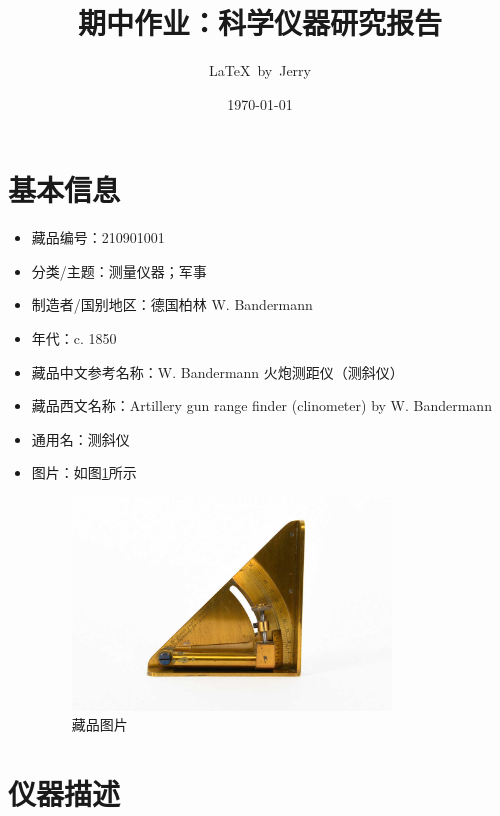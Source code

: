 \documentclass[UTF8]{ctexart}
\title{期中作业：科学仪器研究报告}
\author{\LaTeX\ by\ Jerry}
\date{\today}
\begin{document}
\fancyfoot[C]{\thepage}

\maketitle
\tableofcontents
\newpage

\section{基本信息}

\begin{itemize}
    \item 藏品编号：210901001
    \item 分类/主题：测量仪器；军事
    \item 制造者/国别地区：德国柏林 W. Bandermann
    \item 年代：c. 1850
    \item 藏品中文参考名称：W. Bandermann 火炮测距仪（测斜仪）
    \item 藏品西文名称：Artillery gun range finder (clinometer) by W. Bandermann
    \item 通用名：测斜仪
    \item 图片：如图\ref{fig:raw_pic}所示
        \begin{figure}[h]
            \centering
            \includegraphics[width=0.8\textwidth]{img/21090101.jpg}
            \caption{藏品图片\cite{馆藏目录}}
            \label{fig:raw_pic}
        \end{figure}
\end{itemize}

\section{仪器描述}
\end{document}
